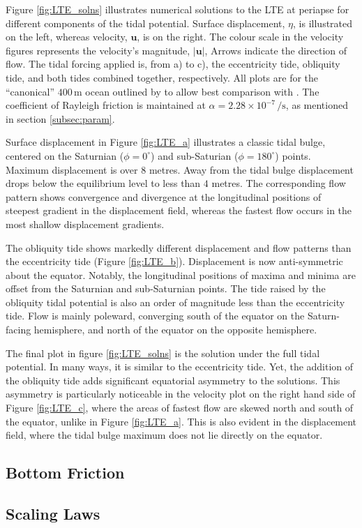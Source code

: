 Figure \ref{fig:LTE_solns} illustrates numerical solutions to the LTE at periapse for different components of the tidal potential. Surface displacement, $\eta$, is illustrated on the left, whereas velocity, $\bm{u}$, is on the right. The colour scale in the velocity figures represents the velocity's magnitude, $\left| \bm{u} \right|$, Arrows indicate the direction of flow. The tidal forcing applied is, from a) to c), the eccentricity tide, obliquity tide, and both tides combined together, respectively. All plots are for the ``canonical'' $400 \, \si{\metre}$ ocean outlined by \citet{sagan1982tide} to allow best comparison with \citet{sears1994tidal,sears1995tidal,sohl1995tidal}. The coefficient of Rayleigh friction is maintained at $\alpha = 2.28 \times 10^{-7} \, \si{\per\second}$, as mentioned in section \ref{subsec:param}.

Surface displacement in Figure \ref{fig:LTE_a} illustrates a classic tidal bulge, centered on the Saturnian ($\phi = 0^{\circ}$) and sub-Saturian ($\phi = 180^{\circ}$) points. Maximum displacement is over $8$ metres. Away from the tidal bulge displacement drops below the equilibrium level to less than $4$ metres. The corresponding flow pattern shows convergence and divergence at the longitudinal positions of steepest gradient in the displacement field, whereas the fastest flow occurs in the most shallow displacement gradients.

The obliquity tide shows markedly different displacement and flow patterns than the eccentricity tide (Figure \ref{fig:LTE_b}). Displacement is now anti-symmetric about the equator. Notably, the longitudinal positions of maxima and minima are offset from the Saturnian and sub-Saturnian points. The tide raised by the obliquity tidal potential is also an order of magnitude less than the eccentricity tide. Flow is mainly poleward, converging south of the equator on the Saturn-facing hemisphere, and north of the equator on the opposite hemisphere.

The final plot in figure \ref{fig:LTE_solns} is the solution under the full tidal potential. In many ways, it is similar to the eccentricity tide. Yet, the addition of the obliquity tide adds significant equatorial asymmetry to the solutions. This asymmetry is particularly noticeable in the velocity plot on the right hand side of Figure \ref{fig:LTE_c}, where the areas of fastest flow are skewed north and south of the equator, unlike in Figure \ref{fig:LTE_a}. This is also evident in the displacement field, where the tidal bulge maximum does not lie directly on the equator.



\subsection{Bottom Friction \label{subsec:result_bottom}}

\subsection{Scaling Laws \label{subsec:scaling}}